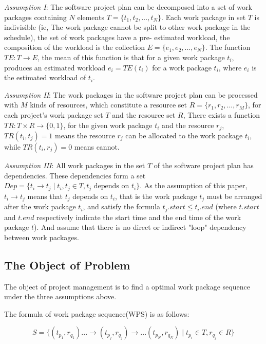 \emph{Assumption I}: The software project plan can be decomposed into a set 
of work packages containing $N$ elements $T = \{t_1, t_2, ..., t_N \}$.  Each 
work package in set $T$ is indivisible (ie, The work package cannot be split 
to other work package in the schedule), the set of work packages have a pre-
estimated workload, the composition of the workload is the collection $E = \{e
_1, e_2, ..., e_N \}$. The function $TE: T \rightarrow E$, the mean of this 
function is that for a given work package $t_i$, produces an estimated 
workload $e_i = TE(t_i)$ for a work package $t_i$, where $e_i$ is the 
estimated workload of $t_i$. 

\emph{Assumption II}: The work packages in the software project plan
can be processed with $M$ kinds of resources, which constitute a
resource set $R = \{r_1, r_2, ..., r_M \}$, for each project's work
package set $T$ and the resource set $R$, There exists a function
$TR: T \times R \rightarrow \{0, 1\}$, for the given work package $t_i$
and the resource $r_j$, $TR(t_i, t_j) = 1$ means the resource $r_j$ can
be allocated to the work package $t_i$, while $TR (t_i, r_j) = 0$ means
cannot.


\emph{Assumption III}: All work packages in the set $T$ of the
software project plan has dependencies. These dependencies form a set
$Dep= \{t_i \rightarrow t_j \mid t_i, t_j \in T, t_j \text{ depends on } t_i\}$.
As the assumption of this paper, $t_i \rightarrow t_j$ means that
$t_j$ depends on $t_i$, that is the work package $t_j$ must be
arranged after the work package $t_i$, and satisfy the formula
$t_j.start \leq t_i.end$ (where $t.start$ and $t.end$ respectively
indicate the start time and the end time of the work package $t$).
And assume that there is no direct or indirect "loop" dependency
between work packages.


\subsection{The Object of Problem}
%
The object of project management is to find a optimal work package sequence
under the three assumptions above.

The formula of work package sequence(WPS) is as follows:

\begin{equation}
  S = \{
  (t_{p_1}, r_{q_1}) ... \rightarrow (t_{p_j}, r_{q_j}) \rightarrow ... (t_{p_N}, r_{q_N})
  \mid t_{p_i} \in T, r_{q_j} \in R
  \}
\end{equation}

